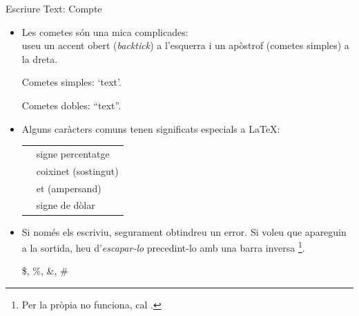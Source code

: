 \begin{frame}[fragile]{Escriure Text: Compte}
\small
\begin{itemize}
\item Les cometes són una mica complicades:\\
useu un accent obert (\textit{backtick}) \keystroke{\`} a l'esquerra i un apòstrof (cometes simples)  a la dreta.
\begin{exampletwouptiny}
Cometes simples: `text'.

Cometes dobles: ``text''.
\end{exampletwouptiny}

\item Alguns caràcters comuns tenen significats especials a \LaTeX:\\[1ex]
\begin{tabular}{cl}
\keystrokebftt{\%} & signe percentatge         \\
\keystrokebftt{\#} & coixinet (sostingut)      \\
\keystrokebftt{\&} & et (ampersand)            \\
\keystrokebftt{\$} & signe de dòlar            \\
\end{tabular}
\item Si només els escriviu, segurament obtindreu un error.
    Si voleu que apareguin a la sortida, heu d'\textit{escapar-lo} precedint-lo amb una barra inversa \keystroke{\textbackslash}\footnote{Per la pròpia \keystrokebftt{\textbackslash} no funciona, cal .}.
\begin{exampletwoup}
\$, \%, \&, \#
\end{exampletwoup}
\end{itemize}
\end{frame}


